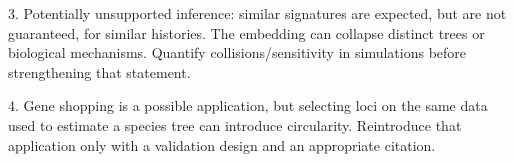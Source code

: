 3. Potentially unsupported inference: similar signatures are expected, but are not guaranteed, for similar histories.
The embedding can collapse distinct trees or biological mechanisms. Quantify collisions/sensitivity in simulations
before strengthening that statement.

4. Gene shopping is a possible application, but selecting loci on the same data used to estimate a species tree can
introduce circularity. Reintroduce that application only with a validation design and an appropriate citation.
\fi
